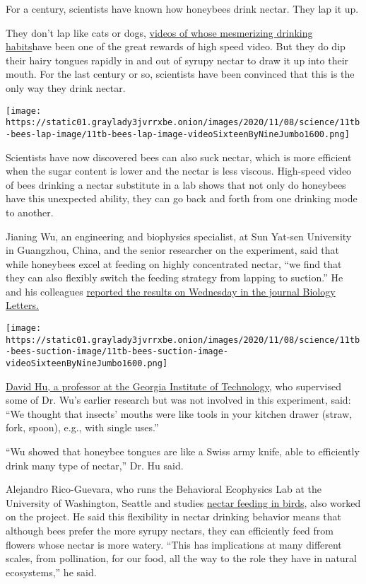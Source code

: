 For a century, scientists have known how honeybees drink nectar. They
lap it up.

They don't lap like cats or dogs,
\href{https://www.nytimes3xbfgragh.onion/video/science/100000003273592/how-dogs-drink.html}{videos
of whose mesmerizing drinking habits}have been one of the great rewards
of high speed video. But they do dip their hairy tongues rapidly in and
out of syrupy nectar to draw it up into their mouth. For the last
century or so, scientists have been convinced that this is the only way
they drink nectar.

\texttt{[image: https://static01.graylady3jvrrxbe.onion/images/2020/11/08/science/11tb-bees-lap-image/11tb-bees-lap-image-videoSixteenByNineJumbo1600.png]}

Scientists have now discovered bees can also suck nectar, which is more
efficient when the sugar content is lower and the nectar is less
viscous. High-speed video of bees drinking a nectar substitute in a lab
shows that not only do honeybees have this unexpected ability, they can
go back and forth from one drinking mode to another.

Jianing Wu, an engineering and biophysics specialist, at Sun Yat-sen
University in Guangzhou, China, and the senior researcher on the
experiment, said that while honeybees excel at feeding on highly
concentrated nectar, ``we find that they can also flexibly switch the
feeding strategy from lapping to suction.'' He and his colleagues
\href{http://\%0A22\%0A23\%0A24\%0A25\%0A26\%0A27\%0A28\%0A29\%0A30\%0A31\%0A32\%0A33\%0A34\%0A35\%0A36\%20feeding\%20strategy,\%20nectar\%20intake\%2037\%0Ahttp://dx.doi.org/10.1098/rsbl.2020.0449}{reported
the results on Wednesday in the journal Biology Letters.}

\texttt{[image: https://static01.graylady3jvrrxbe.onion/images/2020/11/08/science/11tb-bees-suction-image/11tb-bees-suction-image-videoSixteenByNineJumbo1600.png]}

\href{https://www.nytimes3xbfgragh.onion/2018/11/05/science/hu-robotics.html}{David
Hu, a professor at the Georgia Institute of Technology}, who supervised
some of Dr. Wu's earlier research but was not involved in this
experiment, said: ``We thought that insects' mouths were like tools in
your kitchen drawer (straw, fork, spoon), e.g., with single uses.''

``Wu showed that honeybee tongues are like a Swiss army knife, able to
efficiently drink many type of nectar,'' Dr. Hu said.

Alejandro Rico-Guevara, who runs the Behavioral Ecophysics Lab at the
University of Washington, Seattle and studies
\href{https://www.nytimes3xbfgragh.onion/2015/09/08/science/the-hummingbirds-tongue-how-it-works.html}{nectar
feeding in birds}, also worked on the project. He said this flexibility
in nectar drinking behavior means that although bees prefer the more
syrupy nectars, they can efficiently feed from flowers whose nectar is
more watery. ``This has implications at many different scales, from
pollination, for our food, all the way to the role they have in natural
ecosystems,'' he said.

